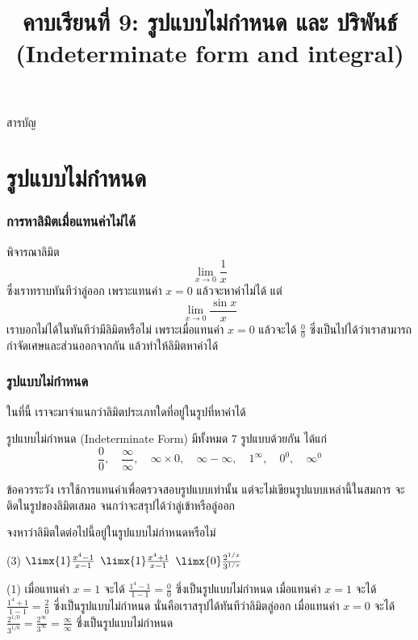 \title{คาบเรียนที่ 9: รูปแบบไม่กำหนด และ ปริพันธ์ \\ (Indeterminate form and integral)}
\frame{\titlepage}

\begin{frame}{สารบัญ}
\tableofcontents
\end{frame}

\section{รูปแบบไม่กำหนด}
\frame{\sectionpage}

\begin{frame}
\frametitle{การหาลิมิตเมื่อแทนค่าไม่ได้}
พิจารณาลิมิต 
\[ \lim_{x \to 0} \frac{1}{x} \]
ซึ่งเราทราบทันทีว่าลู่ออก เพราะแทนค่า $x=0$ แล้วจะหาค่าไม่ได้ แต่
\[ \lim_{x \to 0} \frac{\sin x}{x} \]
เราบอกไม่ได้ในทันทีว่ามีลิมิตหรือไม่ เพราะเมื่อแทนค่า $x=0$ แล้วจะได้ $\frac{0}{0}$ ซึ่งเป็นไปได้ว่าเราสามารถกำจัดเศษและส่วนออกจากกัน แล้วทำให้ลิมิตหาค่าได้
\end{frame}

\begin{frame}
\frametitle{รูปแบบไม่กำหนด}
ในที่นี้ เราจะมาจำแนกว่าลิมิตประเภทใดที่อยู่ในรูปที่หาค่าได้
\begin{defn}{}{}
รูปแบบไม่กำหนด (Indeterminate Form) มีทั้งหมด 7 รูปแบบด้วยกัน ได้แก่
\[ \frac{0}{0}, \quad \frac{\infty}{ \infty}, \quad \infty \times 0, \quad \infty - \infty, \quad 1^{\infty}, \quad 0^0, \quad \infty^0 \]
\end{defn}
\begin{remark}{ข้อควรระวัง}
เราใช้การแทนค่าเพื่อตรวจสอบรูปแบบเท่านั้น แต่จะไม่เขียนรูปแบบเหล่านี้ในสมการ จะติดในรูปของลิมิตเสมอ จนกว่าจะสรุปได้ว่าลู่เข้าหรือลู่ออก
\end{remark}
\end{frame}


\begin{frame}[t]
\begin{ex}
จงหาว่าลิมิตใดต่อไปนี้อยู่ในรูปแบบไม่กำหนดหรือไม่
\begin{tasks}(3)
\task $\limx{1} \frac{x^4-1}{x-1}$
\task $\limx{1} \frac{x^4+1}{x-1}$
\task $\limx{0} \frac{2^{1/x}}{3^{1/x}}$
\end{tasks}
\end{ex}
\end{frame}

\begin{frame}
\begin{sol}
\begin{tasks}(1)
\task เมื่อแทนค่า $x=1$ จะได้ $\frac{1^4-1}{1-1} = \frac{0}{0}$ ซึ่งเป็นรูปแบบไม่กำหนด
\task เมื่อแทนค่า $x=1$ จะได้ $\frac{1^4+1}{1-1} = \frac{2}{0}$ ซึ่งเป็นรูปแบบไม่กำหนด นั่นคือเราสรุปได้ทันทีว่าลิมิตลู่ออก
\task เมื่อแทนค่า $x=0$ จะได้ $\frac{2^{1/0}}{3^{1/0}} = \frac{2^{\infty}}{3^{\infty}} = \frac{\infty}{\infty}$ ซึ่งเป็นรูปแบบไม่กำหนด
\end{tasks}
\end{sol}
\end{frame}


